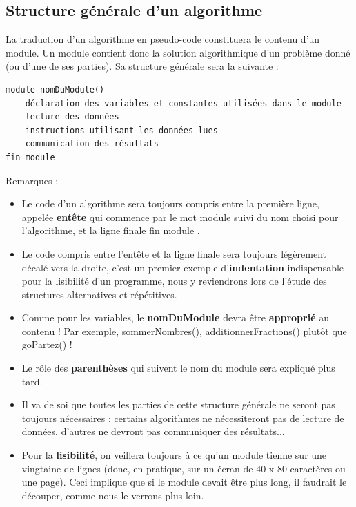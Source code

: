 \documentclass[11pt,a4paper]{article}
\begin{document}
        \subsection{Structure g\'en\'erale d'un algorithme}
          La traduction d'un algorithme en pseudo-code constituera le contenu d'un module. 
          Un module contient donc la solution algorithmique d'un probl\`eme donn\'e (ou d'une de ses parties).
          Sa structure g\'en\'erale sera la suivante :
        
            \par
        \begin{verbatim}
module nomDuModule()
    déclaration des variables et constantes utilisées dans le module
    lecture des données
    instructions utilisant les données lues
    communication des résultats
fin module
				\end{verbatim}
          Remarques :
          
					\begin{itemize}
				
			\item Le code d'un algorithme sera toujours compris entre la premi\`ere ligne, 
            appel\'ee \guillemotleft  \textbf{ent\^ete} \guillemotright  qui commence par le mot \guillemotleft  module \guillemotright  suivi du nom choisi pour l'algorithme,
            et la ligne finale \guillemotleft  fin module \guillemotright .
            
			\item Le code compris entre l'ent\^ete et la ligne finale sera toujours l\'eg\`erement d\'ecal\'e vers la droite, 
              c'est un premier exemple d'\textbf{indentation} indispensable pour la lisibilit\'e d'un programme, 
              nous y reviendrons lors de l'\'etude des structures alternatives et r\'ep\'etitives.
            
			\item Comme pour les variables, le \textbf{nomDuModule} 
            devra \^etre \textbf{appropri\'e} au contenu ! 
            Par exemple, sommerNombres(), additionnerFractions() plut\^ot que goPartez() ! 
            
			\item Le r\^ole des \textbf{parenth\`eses} qui suivent le nom du module sera expliqu\'e plus tard.
			\item Il va de soi que toutes les parties de cette structure g\'en\'erale ne seront pas toujours 
            n\'ecessaires : certains algorithmes ne n\'ecessiteront pas de lecture de donn\'ees, d'autres 
            ne devront pas communiquer des r\'esultats...
            
			\item Pour la \textbf{lisibilit\'e}, 
            on veillera toujours \`a ce qu'un module tienne sur une vingtaine de 
            lignes (donc, en pratique, sur un \'ecran de 40 x 80 caract\`eres ou une page). Ceci implique 
            que si le module devait \^etre plus long, il faudrait le d\'ecouper, comme nous le verrons 
            plus loin.
            
					\end{itemize}
				
\end{document}
